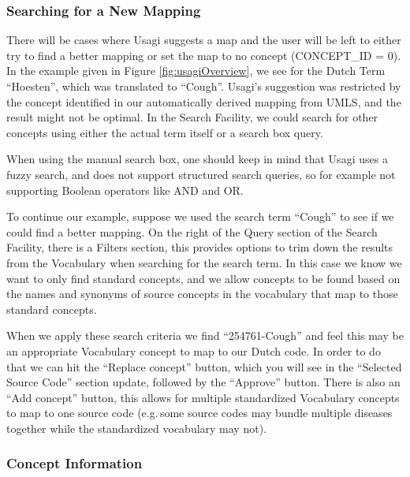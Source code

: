 \documentclass[11pt]{book}
\theoremstyle{definition}
\theoremstyle{definition}
\theoremstyle{definition}
\theoremstyle{remark}
\begin{document}
\subsubsection*{Searching for a New
Mapping}\label{searching-for-a-new-mapping}

There will be cases where Usagi suggests a map and the user will be left
to either try to find a better mapping or set the map to no concept
(CONCEPT\_ID = 0). In the example given in Figure
\ref{fig:usagiOverview}, we see for the Dutch Term ``Hoesten'', which
was translated to ``Cough''. Usagi's suggestion was restricted by the
concept identified in our automatically derived mapping from UMLS, and
the result might not be optimal. In the Search Facility, we could search
for other concepts using either the actual term itself or a search box
query.

When using the manual search box, one should keep in mind that Usagi
uses a fuzzy search, and does not support structured search queries, so
for example not supporting Boolean operators like AND and OR.

To continue our example, suppose we used the search term ``Cough'' to
see if we could find a better mapping. On the right of the Query section
of the Search Facility, there is a Filters section, this provides
options to trim down the results from the Vocabulary when searching for
the search term. In this case we know we want to only find standard
concepts, and we allow concepts to be found based on the names and
synonyms of source concepts in the vocabulary that map to those standard
concepts.

When we apply these search criteria we find ``254761-Cough'' and feel
this may be an appropriate Vocabulary concept to map to our Dutch code.
In order to do that we can hit the ``Replace concept'' button, which you
will see in the ``Selected Source Code'' section update, followed by the
``Approve'' button. There is also an ``Add concept'' button, this allows
for multiple standardized Vocabulary concepts to map to one source code
(e.g.\,some source codes may bundle multiple diseases together while the
standardized vocabulary may not).

\subsubsection*{Concept Information}\label{concept-information}
\end{document}
